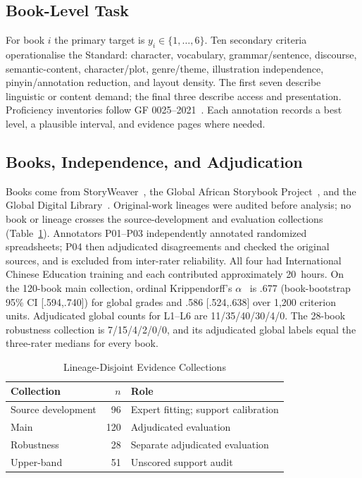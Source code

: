 \documentclass[conference]{IEEEtran}
\begin{document}
\subsection{Book-Level Task}
For book $i$ the primary target is $y_i \in \{1,\dots,6\}$. Ten secondary
criteria operationalise the Standard: character, vocabulary,
grammar/sentence, discourse, semantic-content, character/plot, genre/theme,
illustration independence, pinyin/annotation reduction, and layout density. The
first seven describe linguistic or content demand; the final three describe
access and presentation. Proficiency inventories follow GF
0025--2021~\cite{moe2021standards}. Each annotation records a best level, a
plausible interval, and evidence pages where needed.

\subsection{Books, Independence, and Adjudication}
Books come from StoryWeaver~\cite{pratham2026storyweaver}, the Global African
Storybook Project~\cite{gasp2026repository}, and the Global Digital
Library~\cite{gdl2026api}. Original-work lineages were audited before analysis;
no book or lineage crosses the source-development and evaluation collections
(Table~\ref{tab_collections}). Annotators P01--P03 independently annotated
randomized spreadsheets; P04 then adjudicated disagreements and checked the
original sources, and is excluded from inter-rater reliability. All four had
International Chinese Education training and each contributed approximately
20~hours. On the 120-book main collection, ordinal Krippendorff's
$\alpha$~\cite{hayes2007answering} is .677 (book-bootstrap 95\% CI [.594,.740])
for global grades and .586 [.524,.638] over 1{,}200 criterion units. Adjudicated
global counts for L1--L6 are 11/35/40/30/4/0. The 28-book robustness collection
is 7/15/4/2/0/0, and its adjudicated global labels equal the three-rater medians
for every book.

\begin{table}[t]
\caption{Lineage-Disjoint Evidence Collections}
\label{tab_collections}
\centering
\footnotesize
\begin{tabular}{lrl}
\toprule
Collection & $n$ & Role \\
\midrule
Source development & 96 & Expert fitting; support calibration \\
Main & 120 & Adjudicated evaluation \\
Robustness & 28 & Separate adjudicated evaluation \\
Upper-band & 51 & Unscored support audit \\
\bottomrule
\end{tabular}
\end{table}
\end{document}
